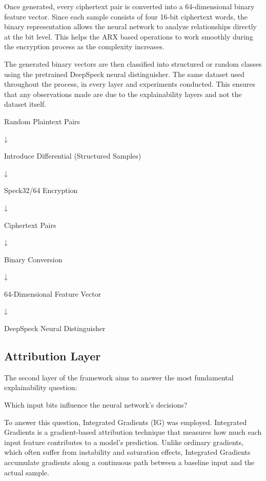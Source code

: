 Once generated, every ciphertext pair is converted into a 64-dimensional binary feature vector. 
Since each sample consists of four 16-bit ciphertext words, the binary representation allows the 
neural network to analyze relationships directly at the bit level. This helps the ARX based 
operations to work smoothly during the encryption process as the complexity increases. 

The generated binary vectors are then classified into structured or random classes using the 
pretrained DeepSpeck neural distinguisher. The same dataset used throughout the process, in 
every layer and experiments conducted. This ensures that any observations made are due to the 
explainability layers and not the dataset itself. 

   Random Plaintext Pairs 

          ↓ 

  Introduce Differential (Structured Samples) 

          ↓ 

                Speck32/64 Encryption 

          ↓ 

                      Ciphertext Pairs 

          ↓ 

                                            Binary Conversion 

          ↓ 

         64-Dimensional Feature Vector 

          ↓ 

         DeepSpeck Neural Distinguisher 

\subsection{Attribution Layer}

The second layer of the framework aims to answer the most fundamental explainability question: 

Which input bits influence the neural network's decisions? 

To answer this question, Integrated Gradients (IG) was employed. Integrated Gradients is a 
gradient-based attribution technique that measures how much each input feature contributes to a 
model's prediction. Unlike ordinary gradients, which often suffer from instability and saturation 
effects, Integrated Gradients accumulate gradients along a continuous path between a baseline 
input and the actual sample. 

